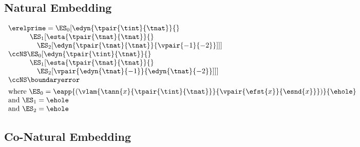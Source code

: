 \subsection{Natural Embedding}

$\begin{array}{l}
  \erelprime = \ES_0[\edyn{\tpair{\tint}{\tnat}}{}
\\\qquad\quad \ES_1[\esta{\tpair{\tnat}{\tnat}}{}
\\\qquad\quad\quad\ES_2[\edyn{\tpair{\tnat}{\tnat}}{\vpair{-1}{-2}}]]]
\\\ccNS \ES_0[\edyn{\tpair{\tint}{\tnat}}{}
\\\qquad\quad \ES_1[\esta{\tpair{\tnat}{\tnat}}{}
\\\qquad\quad\quad \ES_2[\vpair{\edyn{\tnat}{{-1}}}{\edyn{\tnat}{{-2}}}]]]
\\\ccNS \boundaryerror
\\[1ex]
  \mbox{where } \ES_0 = \eapp{(\vlam{\tann{x}{\tpair{\tint}{\tnat}}}{\vpair{\efst{x}}{\esnd{x}}})}{\ehole}
\\\mbox{and } \ES_1 = \ehole
\\\mbox{and } \ES_2 = \ehole
\end{array}$


\subsection{Co-Natural Embedding}

